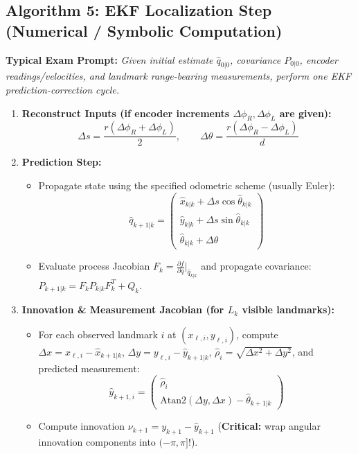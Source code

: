 \documentclass[10pt, a4paper]{article}
\begin{document}
\subsection*{Algorithm 5: EKF Localization Step (Numerical / Symbolic Computation)}
\textbf{Typical Exam Prompt:} \textit{Given initial estimate $\hat{q}_{0|0}$, covariance $P_{0|0}$, encoder readings/velocities, and landmark range-bearing measurements, perform one EKF prediction-correction cycle.}
\begin{enumerate}
    \item \textbf{Reconstruct Inputs (if encoder increments $\Delta\phi_R, \Delta\phi_L$ are given):}
    \[
        \Delta s = \frac{r(\Delta\phi_R + \Delta\phi_L)}{2}, \qquad \Delta\theta = \frac{r(\Delta\phi_R - \Delta\phi_L)}{d}
    \]
    \item \textbf{Prediction Step:}
    \begin{itemize}
        \item Propagate state using the specified odometric scheme (usually Euler):
        \[
            \hat{q}_{k+1|k} = \begin{pmatrix} \hat{x}_{k|k} + \Delta s\cos\hat{\theta}_{k|k} \\ \hat{y}_{k|k} + \Delta s\sin\hat{\theta}_{k|k} \\ \hat{\theta}_{k|k} + \Delta\theta \end{pmatrix}
        \]
        \item Evaluate process Jacobian $F_k = \frac{\partial f}{\partial q}\big|_{\hat{q}_{k|k}}$ and propagate covariance: $P_{k+1|k} = F_k P_{k|k} F_k^T + Q_k$.
    \end{itemize}
    \item \textbf{Innovation \& Measurement Jacobian (for $L_k$ visible landmarks):}
    \begin{itemize}
        \item For each observed landmark $i$ at $(x_{\ell,i}, y_{\ell,i})$, compute $\Delta x = x_{\ell,i} - \hat{x}_{k+1|k}$, $\Delta y = y_{\ell,i} - \hat{y}_{k+1|k}$, $\hat{\rho}_i = \sqrt{\Delta x^2 + \Delta y^2}$, and predicted measurement:
        \[
            \hat{y}_{k+1,i} = \begin{pmatrix} \hat{\rho}_i \\ \text{Atan2}(\Delta y, \Delta x) - \hat{\theta}_{k+1|k} \end{pmatrix}
        \]
        \item Compute innovation $\nu_{k+1} = y_{k+1} - \hat{y}_{k+1}$ (\textbf{Critical:} wrap angular innovation components into $(-\pi, \pi]$!).

\end{itemize}
\end{enumerate}
\end{document}
